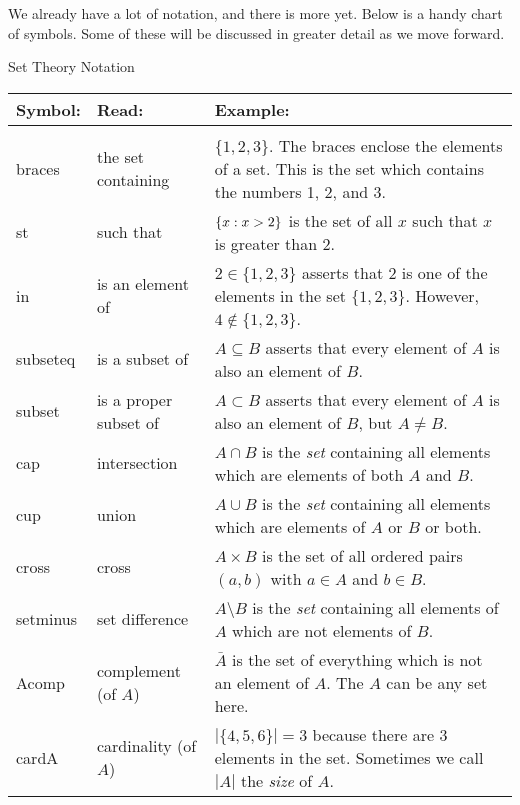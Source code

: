 \documentclass[12pt]{article}
\begin{document}
We already have a lot of notation, and there is more yet.  Below is a handy chart of symbols.  Some of these will be discussed in greater detail as we move forward.



\begin{defbox}{Set Theory Notation}
\noindent  \begin{tabular}{p{.65in} p{1.35in} p{3.1in}}
    Symbol: & Read: & Example: \\ \hline \\
    \gls{braces} & the set containing & $\{1,2,3\}$.  The braces enclose the elements of a set.  This is the set which contains the numbers 1, 2, and 3.\\[.5ex]
    \gls{st} & such that & $\{x : x > 2\}$ is the set of all $x$ such that $x$ is greater than 2.\\[1ex]
    \gls{in} & is an element of & $2 \in \{1,2,3\}$ asserts that 2 is one of the elements in the set $\{1,2,3\}$.  However, $4 \notin\{1,2,3\}$.\\[.5ex]
    \gls{subseteq} & is a subset of & $A \subseteq B$ asserts that every element of $A$ is also an element of $B$.\\[.5ex]
    \gls{subset} & is a proper subset of & $A \subset B$ asserts that every element of $A$ is also an element of $B$, but $A \ne B$.\\[.5ex]
    \gls{cap} & intersection\index{intersection} & $A \cap B$ is the \emph{set} containing all elements which are elements of both $A$ and $B$.\\[.5ex]
    \gls{cup} & union\index{union} & $A \cup B$ is the \emph{set} containing all elements which are elements of $A$ or $B$ or both.\\[.5ex]
    \gls{cross} & cross & $A \times B$ is the set of all ordered pairs $(a,b)$ with $a \in A$ and $b \in B$. \\[1ex]
    \gls{setminus} & set difference & $A \setminus B$ is the \emph{set} containing all elements of $A$ which are not elements of $B$.\\[.5ex]
    \gls{Acomp} & complement (of $A$) & $\bar A$ is the set of everything which is not an element of $A$.  The $A$ can be any set here.\\[.5ex]
    \gls{cardA} & cardinality\index{cardinality} (of $A$)& $|\{4,5,6\}| = 3$ because there are 3 elements in the set.  Sometimes we call $|A|$ the \emph{size} of $A$.\\[.5ex]
\end{tabular}


\end{defbox}
\end{document}
